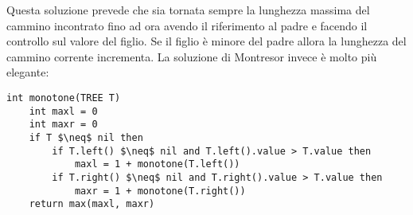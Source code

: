 \documentclass[../cheatSheetAlgoritmi.tex]{subfiles}
\begin{document}
Questa soluzione prevede che sia tornata sempre la lunghezza massima del cammino incontrato fino ad ora avendo il riferimento al padre e facendo il controllo sul valore del figlio. Se il figlio è minore del padre allora la lunghezza del cammino corrente incrementa.
La soluzione di Montresor invece è molto più elegante:
\begin{lstlisting}[caption=Percorso cammino-discendente Montresor]
int monotone(TREE T)
	int maxl = 0
	int maxr = 0
	if T $\neq$ nil then
		if T.left() $\neq$ nil and T.left().value > T.value then
			maxl = 1 + monotone(T.left())
		if T.right() $\neq$ nil and T.right().value > T.value then
			maxr = 1 + monotone(T.right())
	return max(maxl, maxr)
\end{lstlisting}

\newpage
\end{document}
